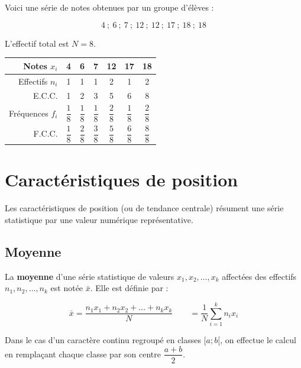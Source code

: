 \begin{ex}
	Voici une série de notes obtenues par un groupe d'élèves :

	\[
		4 \ ; \ 6 \ ; \ 7 \ ; \ 12 \ ; \ 12 \ ; \ 17 \ ; \ 18 \ ; \ 18
	\]

	L'effectif total est $N = 8$.

	\begin{center}
		\begin{tabular}{|r|c|c|c|c|c|c|}
			\hline
			\rowcolor{gray!30}Notes $x_i$          & 4              & 6              & 7              & 12             & 17             & 18             \\ \hline
			Effectifs $n_i$                        & 1              & 1              & 1              & 2              & 1              & 2              \\ \hline
			E.C.C.                                 & 1              & 2              & 3              & 5              & 6              & 8              \\ \hline
			\rule[-4mm]{0mm}{11mm}Fréquences $f_i$ & $\dfrac{1}{8}$ & $\dfrac{1}{8}$ & $\dfrac{1}{8}$ & $\dfrac{2}{8}$ & $\dfrac{1}{8}$ & $\dfrac{2}{8}$ \\ \hline
			\rule[-4mm]{0mm}{11mm}F.C.C.           & $\dfrac{1}{8}$ & $\dfrac{2}{8}$ & $\dfrac{3}{8}$ & $\dfrac{5}{8}$ & $\dfrac{6}{8}$ & $\dfrac{8}{8}$ \\ \hline
		\end{tabular}
	\end{center}
\end{ex}

\section{Caractéristiques de position}

Les caractéristiques de position (ou de tendance centrale) résument une série statistique par une valeur numérique représentative.

\subsection{Moyenne}

\begin{defin}
	La \textbf{moyenne} d'une série statistique de valeurs $x_1, x_2, \dots, x_k$ affectées des effectifs $n_1, n_2, \dots, n_k$ est notée $\bar{x}$. Elle est définie par :

	\[
		\bar{x} = \dfrac{n_1 x_1 + n_2 x_2 + \dots + n_k x_k}{N} \qquad = \dfrac{1}{N} \sum_{i=1}^k n_i x_i
	\]

	Dans le cas d'un caractère continu regroupé en classes $[a ; b[$, on effectue le calcul en remplaçant chaque classe par son centre $\dfrac{a+b}{2}$.
\end{defin}

